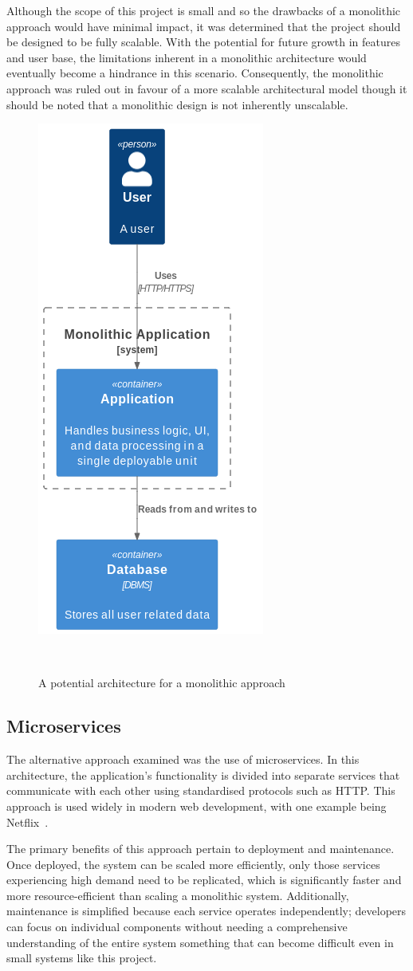 Although the scope of this project is small and so the drawbacks of a monolithic approach would have minimal impact, it was determined that the project should be designed to be fully scalable. With the potential for future growth in features and user base, the limitations inherent in a monolithic architecture would eventually become a hindrance in this scenario. Consequently, the monolithic approach was ruled out in favour of a more scalable architectural model though it should be noted that a monolithic design is not inherently unscalable.

\begin{figure} [H]
    \centering
    \includegraphics[width=0.35\linewidth]{figures/monolithic_arch.png}
    \caption{A potential architecture for a monolithic approach}
~\label{fig:monolith-arch}
\end{figure}

\subsection{Microservices}
The alternative approach examined was the use of microservices. In this architecture, the application's functionality is divided into separate services that communicate with each other using standardised protocols such as HTTP. This approach is used widely in modern web development, with one example being Netflix~\cite{NetflixMicroservices}.

The primary benefits of this approach pertain to deployment and maintenance. Once deployed, the system can be scaled more efficiently, only those services experiencing high demand need to be replicated, which is significantly faster and more resource-efficient than scaling a monolithic system. Additionally, maintenance is simplified because each service operates independently; developers can focus on individual components without needing a comprehensive understanding of the entire system something that can become difficult even in small systems like this project.


